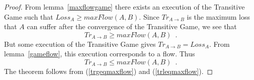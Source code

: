 \begin{proof}%
   From lemma~\ref{maxflowgame} there exists an execution of the Transitive Game such that
   $Loss_A \geq maxFlow\left(A, B\right)$.
   Since $Tr_{A \rightarrow B}$ is the maximum loss that $A$ can suffer after the convergence of the Transitive Game, we
   see that
   \begin{equation}
   \label{trgeqmaxflow}
      Tr_{A \rightarrow B} \geq maxFlow\left(A, B\right) \enspace.
   \end{equation}
   But some execution of the Transitive Game gives $Tr_{A \rightarrow B} = Loss_A$.
   From lemma~\ref{gameflow}, this execution corresponds to a flow. Thus
   \begin{equation}
   \label{trleqmaxflow}
      Tr_{A \rightarrow B} \leq maxFlow\left(A, B\right) \enspace.
   \end{equation}
   The theorem follows from (\ref{trgeqmaxflow}) and (\ref{trleqmaxflow}).
\end{proof}

